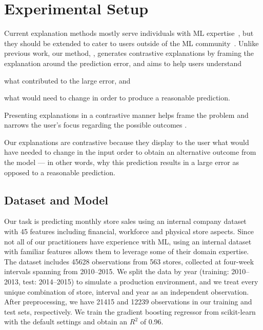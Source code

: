 
\section{Experimental Setup} 
\label{section:4}
Current explanation methods mostly serve individuals with ML expertise~\citep{guidotti-2018-survey,bhatt_explainable_2019}, but they should be extended to cater to users outside of the ML community~\citep{miller-2017-explanations}. 
Unlike previous work, our method, \OurMethod{}, generates contrastive explanations by framing the explanation around the prediction error, and aims to help users understand
\begin{inparaenum}[(i)]
\item what contributed to the large error, and 
\item what would need to change in order to produce a reasonable prediction. 
\end{inparaenum}
Presenting explanations in a contrastive manner helps frame the problem and narrows the user's focus regarding the possible outcomes \citep{hilton-1990-conversational,lipton-1990-contrastive}. 

Our explanations are contrastive because they display to the user what would have needed to change in the input order to obtain an alternative outcome from the model --- in other words, why this prediction results in a large error as opposed to a reasonable prediction. 

\subsection{Dataset and Model}
\label{section:dataset}
Our task is predicting monthly store sales using an internal company dataset with 45 features including financial, workforce and physical store aspects. 
Since not all of our practitioners have experience with ML, using an internal dataset with familiar features allows them to leverage some of their domain expertise. 
The dataset includes 45628 observations from 563 stores, collected at four-week intervals spanning from 2010--2015. 
We split the data by year (training: 2010--2013, test: 2014--2015) to simulate a production environment, and we treat every unique combination of store, interval and year as an independent observation. 
After preprocessing, we have 21415 and 12239 observations in our training and test sets, respectively. 
We train the gradient boosting regressor from scikit-learn with the default settings and obtain an $R^{2}$ of 0.96. 



